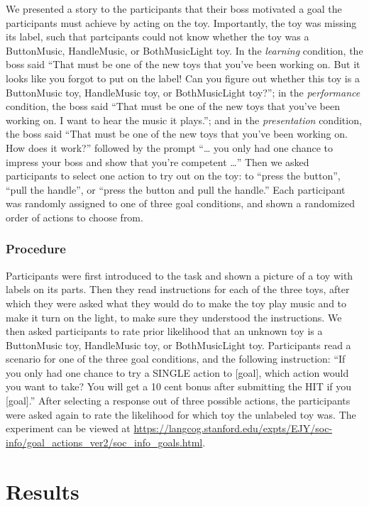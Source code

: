 \documentclass[10pt, letterpaper]{article}
\begin{document}
We presented a story to the participants that their boss motivated a
goal the participants must achieve by acting on the toy. Importantly,
the toy was missing its label, such that partcipants could not know
whether the toy was a ButtonMusic, HandleMusic, or BothMusicLight toy.
In the \emph{learning} condition, the boss said ``That must be one of
the new toys that you've been working on. But it looks like you forgot
to put on the label! Can you figure out whether this toy is a
ButtonMusic toy, HandleMusic toy, or BothMusicLight toy?''; in the
\emph{performance} condition, the boss said ``That must be one of the
new toys that you've been working on. I want to hear the music it
plays.''; and in the \emph{presentation} condition, the boss said ``That
must be one of the new toys that you've been working on. How does it
work?'' followed by the prompt ``\ldots{} you only had one chance to
impress your boss and show that you're competent \ldots{}'' Then we
asked participants to select one action to try out on the toy: to
``press the button'', ``pull the handle'', or ``press the button and
pull the handle.'' Each participant was randomly assigned to one of
three goal conditions, and shown a randomized order of actions to choose
from.

\subsubsection{Procedure}\label{procedure}

Participants were first introduced to the task and shown a picture of a
toy with labels on its parts. Then they read instructions for each of
the three toys, after which they were asked what they would do to make
the toy play music and to make it turn on the light, to make sure they
understood the instructions. We then asked participants to rate prior
likelihood that an unknown toy is a ButtonMusic toy, HandleMusic toy, or
BothMusicLight toy. Participants read a scenario for one of the three
goal conditions, and the following instruction: ``If you only had one
chance to try a SINGLE action to {[}goal{]}, which action would you want
to take? You will get a 10 cent bonus after submitting the HIT if you
{[}goal{]}.'' After selecting a response out of three possible actions,
the participants were asked again to rate the likelihood for which toy
the unlabeled toy was. The experiment can be viewed at
\url{https://langcog.stanford.edu/expts/EJY/soc-info/goal_actions_ver2/soc_info_goals.html}.

\section{Results}\label{results}
\end{document}
